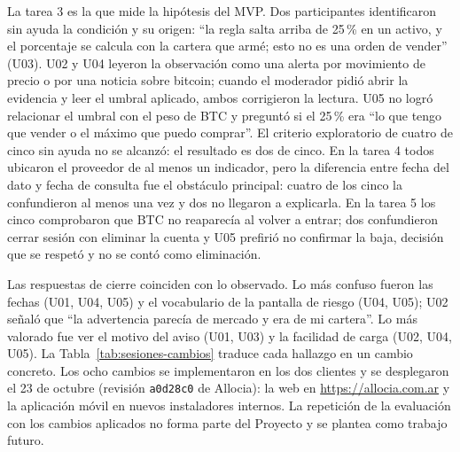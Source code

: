 La tarea 3 es la que mide la hipótesis del MVP. Dos participantes identificaron sin ayuda la condición y su origen: \enquote{la regla salta arriba de 25\,\% en un activo, y el porcentaje se calcula con la cartera que armé; esto no es una orden de vender} (U03). U02 y U04 leyeron la observación como una alerta por movimiento de precio o por una noticia sobre bitcoin; cuando el moderador pidió abrir la evidencia y leer el umbral aplicado, ambos corrigieron la lectura. U05 no logró relacionar el umbral con el peso de BTC y preguntó si el 25\,\% era \enquote{lo que tengo que vender o el máximo que puedo comprar}. El criterio exploratorio de cuatro de cinco sin ayuda no se alcanzó: el resultado es dos de cinco. En la tarea 4 todos ubicaron el proveedor de al menos un indicador, pero la diferencia entre fecha del dato y fecha de consulta fue el obstáculo principal: cuatro de los cinco la confundieron al menos una vez y dos no llegaron a explicarla. En la tarea 5 los cinco comprobaron que BTC no reaparecía al volver a entrar; dos confundieron cerrar sesión con eliminar la cuenta y U05 prefirió no confirmar la baja, decisión que se respetó y no se contó como eliminación.

Las respuestas de cierre coinciden con lo observado. Lo más confuso fueron las fechas (U01, U04, U05) y el vocabulario de la pantalla de riesgo (U04, U05); U02 señaló que \enquote{la advertencia parecía de mercado y era de mi cartera}. Lo más valorado fue ver el motivo del aviso (U01, U03) y la facilidad de carga (U02, U04, U05). La Tabla~\ref{tab:sesiones-cambios} traduce cada hallazgo en un cambio concreto. Los ocho cambios se implementaron en los dos clientes y se desplegaron el 23 de octubre (revisión \texttt{a0d28c0} de Allocia): la web en \url{https://allocia.com.ar} y la aplicación móvil en nuevos instaladores internos. La repetición de la evaluación con los cambios aplicados no forma parte del Proyecto y se plantea como trabajo futuro.

